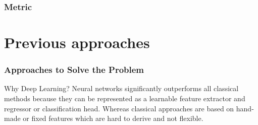 \documentclass{beamer}
\begin{document}
\begin{frame}
    \frametitle{Metric}

\end{frame}

\section{Previous approaches}

\begin{frame}
    \frametitle{Approaches to Solve the Problem}

    \centering

    \vspace*{0.5cm}
    \begin{block}{Why Deep Learning?}
        Neural networks significantly outperforms all classical
        methods because they can be represented as a learnable feature
        extractor and regressor or classification head. Whereas classical approaches are
        based on hand-made or fixed features which are hard to derive and not flexible.
    \end{block}

\end{frame}
\end{document}

